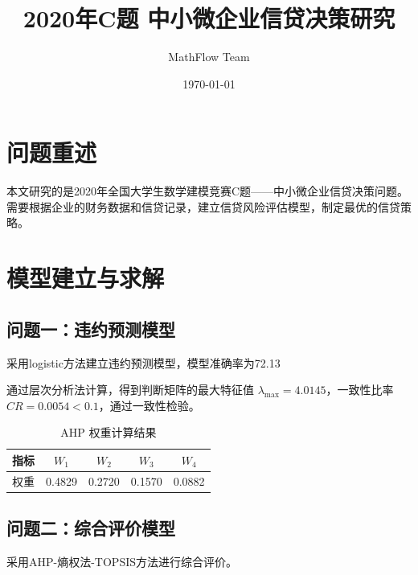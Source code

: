 \documentclass[12pt,a4paper]{article}
\title{2020年C题 中小微企业信贷决策研究}
\author{MathFlow Team}
\date{\today}
\begin{document}
\maketitle
\tableofcontents
\newpage


\section{问题重述}


本文研究的是2020年全国大学生数学建模竞赛C题——中小微企业信贷决策问题。需要根据企业的财务数据和信贷记录，建立信贷风险评估模型，制定最优的信贷策略。


\section{模型建立与求解}


\subsection{问题一：违约预测模型}


采用logistic方法建立违约预测模型，模型准确率为72.13%


通过层次分析法计算，得到判断矩阵的最大特征值 $\lambda_{\max} = 4.0145$，一致性比率 $CR = 0.0054 < 0.1$，通过一致性检验。


\begin{table}[H]
  \centering
  \caption{AHP 权重计算结果}
  \begin{tabular}{lcccc}
    \toprule
    指标 & $W_{1}$ & $W_{2}$ & $W_{3}$ & $W_{4}$ \\
    \midrule
    权重 & 0.4829 & 0.2720 & 0.1570 & 0.0882 \\
    \bottomrule
  \end{tabular}
  \label{tab:ahp_weights}
\end{table}


\subsection{问题二：综合评价模型}


采用AHP-熵权法-TOPSIS方法进行综合评价。
\end{document}
